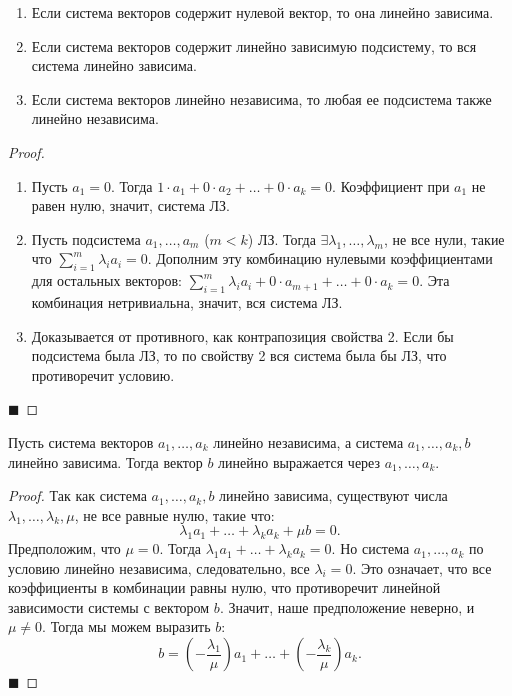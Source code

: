 \begin{theorem}
\begin{enumerate}
    \item Если система векторов содержит нулевой вектор, то она линейно зависима.
    \item Если система векторов содержит линейно зависимую подсистему, то вся система линейно зависима.
    \item Если система векторов линейно независима, то любая ее подсистема также линейно независима.
\end{enumerate}
\end{theorem}

\begin{proof}
\begin{enumerate}
    \item Пусть $a_1 = 0$. Тогда $1 \cdot a_1 + 0 \cdot a_2 + \dots + 0 \cdot a_k = 0$. Коэффициент при $a_1$ не равен нулю, значит, система ЛЗ.
    \item Пусть подсистема $a_1, \dots, a_m$ ($m < k$) ЛЗ. Тогда $\exists \lambda_1, \dots, \lambda_m$, не все нули, такие что $\sum_{i=1}^m \lambda_i a_i = 0$. Дополним эту комбинацию нулевыми коэффициентами для остальных векторов: $\sum_{i=1}^m \lambda_i a_i + 0 \cdot a_{m+1} + \dots + 0 \cdot a_k = 0$. Эта комбинация нетривиальна, значит, вся система ЛЗ.
    \item Доказывается от противного, как контрапозиция свойства 2. Если бы подсистема была ЛЗ, то по свойству 2 вся система была бы ЛЗ, что противоречит условию.
\end{enumerate}
\hfill$\blacksquare$
\end{proof}

\begin{theorem}
Пусть система векторов $a_1, \dots, a_k$ линейно независима, а система $a_1, \dots, a_k, b$ линейно зависима. Тогда вектор $b$ линейно выражается через $a_1, \dots, a_k$.
\end{theorem}

\begin{proof}
Так как система $a_1, \dots, a_k, b$ линейно зависима, существуют числа $\lambda_1, \dots, \lambda_k, \mu$, не все равные нулю, такие что:
\[
\lambda_1 a_1 + \dots + \lambda_k a_k + \mu b = 0.
\]
Предположим, что $\mu = 0$. Тогда $\lambda_1 a_1 + \dots + \lambda_k a_k = 0$. Но система $a_1, \dots, a_k$ по условию линейно независима, следовательно, все $\lambda_i = 0$. Это означает, что все коэффициенты в комбинации равны нулю, что противоречит линейной зависимости системы с вектором $b$. 
Значит, наше предположение неверно, и $\mu \neq 0$. Тогда мы можем выразить $b$:
\[
b = \left(-\frac{\lambda_1}{\mu}\right) a_1 + \dots + \left(-\frac{\lambda_k}{\mu}\right) a_k.
\]
\hfill$\blacksquare$
\end{proof}
